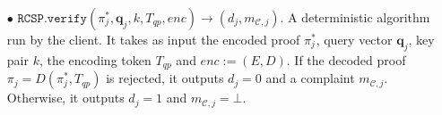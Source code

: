 \begin{definition}[RC-S-P Scheme]
\begin{itemize}



\

\item[$\bullet$] $\mathtt{RCSP}.\mathtt{verify}(\pi^{\scriptscriptstyle *}_{\scriptscriptstyle j}, \bm{q}_{\scriptscriptstyle j},k,T_{\scriptscriptstyle qp},enc)\rightarrow (d_{\scriptscriptstyle j},m_{\scriptscriptstyle \mathcal{C},j})$. A deterministic algorithm run by the client. It takes as input the encoded proof $\pi^{\scriptscriptstyle *}_{\scriptscriptstyle j}$,  query vector $\bm{q}_{\scriptscriptstyle j}$, key pair $k$,  the encoding token $T_{\scriptscriptstyle qp}$ and $enc:=(E,D)$. If the decoded proof $\pi_{\scriptscriptstyle j}=D(\pi^{\scriptscriptstyle *}_{\scriptscriptstyle j},T_{\scriptscriptstyle qp})$ is rejected,  it outputs $d_{\scriptscriptstyle j}=0$ and a complaint $m_{\scriptscriptstyle \mathcal{C},j}$. Otherwise, it outputs  $d_{\scriptscriptstyle j}=1$ and $m_{\scriptscriptstyle \mathcal{C},j}=\bot$.





\end{itemize}
\end{definition}
